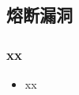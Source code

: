 \subsection{熔断漏洞} %
\begin{frame}
    \frametitle{xx}
    \begin{itemize}
        \item xx
    \end{itemize}
\end{frame}

% 
% 
% 
% 
% 
% 
% 
% 
% 
